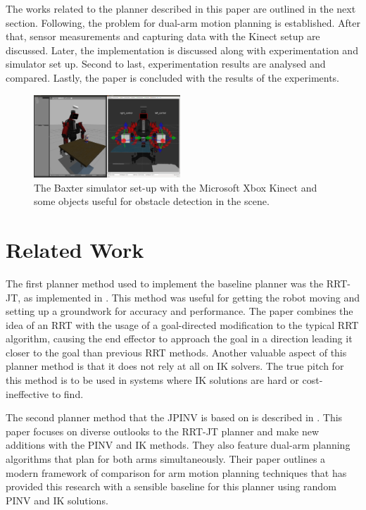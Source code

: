 \documentclass[conference]{IEEEtran} \usepackage[T1]{fontenc} \usepackage[backend=biber, style=ieee]{biblatex}
\begin{document}
The works related to the planner described in this paper are outlined in the next section. Following, the problem for dual-arm motion planning is established. 
After that, sensor measurements and capturing data with the Kinect setup are discussed. Later, the implementation is discussed along with experimentation and 
simulator set up. Second to last, experimentation results are analysed and compared. Lastly, the paper is concluded with the results of the experiments.

\begin{figure}
\label{pic1} 
\centering 
\includegraphics[width=0.49\textwidth]{sim1}
\caption{The Baxter simulator set-up with the Microsoft Xbox Kinect and some objects useful for obstacle detection in the scene.}
\end{figure}

\section{Related Work} \label{Related Work}

The first planner method used to implement the baseline planner was the RRT-JT, as implemented in \cite{random_planner_wo_ik}. This method was useful for getting the 
robot moving and setting up a groundwork for accuracy and performance. The paper combines the idea of an RRT with the usage of a goal-directed modification to 
the typical RRT algorithm, causing the end effector to approach the goal in a direction leading it closer to the goal than previous RRT methods. Another valuable 
aspect of this planner method is that it does not rely at all on IK solvers. The true pitch for this method is to be used in systems where IK solutions are hard 
or cost-ineffective to find.

The second planner method that the JPINV is based on is described in \cite{humanoid_motion_planning}. This paper focuses on diverse outlooks to the RRT-JT planner and 
make new additions with the PINV and IK methods. They also feature dual-arm planning algorithms that plan for both arms simultaneously. Their paper outlines a 
modern framework of comparison for arm motion planning techniques that has provided this research with a sensible baseline for this planner using random PINV and 
IK solutions.
\end{document}
